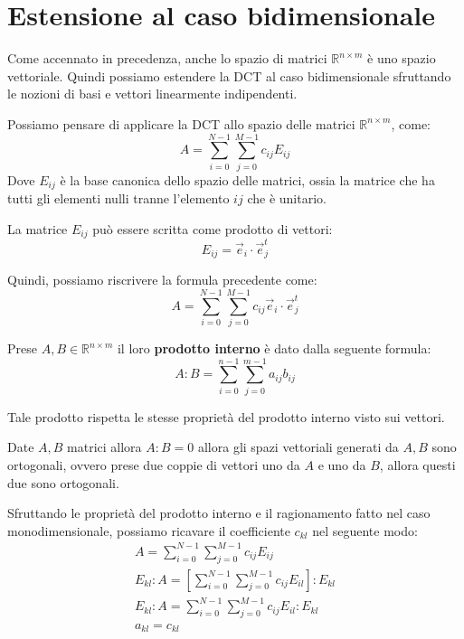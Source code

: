 \section{Estensione al caso bidimensionale}
Come accennato in precedenza, anche lo spazio di matrici $\mathbb{R}^{n\times m}$
è uno spazio vettoriale. Quindi possiamo estendere la DCT al caso bidimensionale
sfruttando le nozioni di basi e vettori linearmente indipendenti.

Possiamo pensare di applicare la DCT allo spazio delle matrici $\mathbb{R}^{n\times m}$,
come:
\begin{equation*}
    A = \sum_{i=0}^{N-1} \sum_{j=0}^{M-1} c_{ij} E_{ij}
\end{equation*}
Dove $E_{ij}$ è la base canonica dello spazio delle matrici, ossia la matrice
che ha tutti gli elementi nulli tranne l'elemento $ij$ che è unitario.
\begin{nota}
    La matrice $E_{ij}$ può essere scritta come prodotto di vettori:
    \begin{equation*}
        E_{ij} = \vec{e}_i \cdot \vec{e}_j^t
    \end{equation*}
\end{nota}
Quindi, possiamo riscrivere la formula precedente come:
\begin{equation*}
    A = \sum_{i=0}^{N-1} \sum_{j=0}^{M-1} c_{ij} \vec{e}_i \cdot \vec{e}_j^t
\end{equation*}
\begin{definizione}
    Prese $A,B \in \mathbb{R}^{n\times m}$ il loro \textbf{prodotto interno} è
    dato dalla seguente formula:
    \begin{equation}
        A:B = \sum_{i=0}^{n-1} \sum_{j= 0}^{m-1} a_{ij}b_{ij}
    \end{equation}
\end{definizione}
Tale prodotto rispetta le stesse proprietà del prodotto interno visto sui vettori.
\begin{nota}
    Date $A,B$ matrici allora $A:B=0$ allora gli spazi vettoriali generati da $A,B$
    sono ortogonali, ovvero prese due coppie di vettori uno da $A$ e uno da $B$,
    allora questi due sono ortogonali.
\end{nota}
Sfruttando le proprietà del prodotto interno e il ragionamento fatto nel caso
monodimensionale, possiamo ricavare il coefficiente $c_{kl}$ nel seguente modo:
\begin{equation*}
    \begin{array}{l}
        A = \sum_{i=0}^{N-1}\sum_{j=0}^{M-1}c_{ij} E_{ij}                               \\
        E_{kl} : A = \left[\sum_{i=0}^{N-1}\sum_{j=0}^{M-1}c_{ij} E_{il}\right]: E_{kl} \\
        E_{kl} : A = \sum_{i=0}^{N-1}\sum_{j=0}^{M-1}c_{ij} E_{il}: E_{kl}              \\
        a_{kl} = c_{kl}
    \end{array}
\end{equation*}
